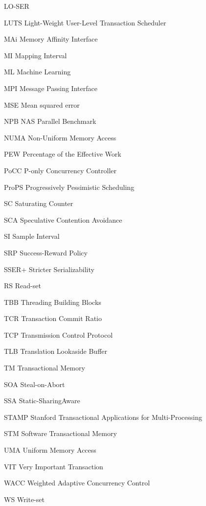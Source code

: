\documentclass[tese,capa,english]{texufpel}
\begin{document}
\begin{listofabbrv}{LO-SER}
	\item[LUTS]			Light-Weight User-Level Transaction Scheduler
	\item[MAi]			Memory Affinity Interface
	\item[MI]			Mapping Interval
	\item[ML]			Machine Learning	
	\item[MPI] 			Message Passing Interface
	\item[MSE]			Mean squared error
	\item[NPB]			NAS Parallel Benchmark
	\item[NUMA]  		Non-Uniform Memory Access
	\item[PEW]			Percentage of the Effective Work
	\item[PoCC]  		P-only Concurrency Controller 
	\item[ProPS] 		Progressively Pessimistic Scheduling
	\item[SC]			Saturating Counter
	\item[SCA]			Speculative Contention Avoidance
	\item[SI]				Sample Interval
	\item[SRP] 			Success-Reward Policy
	\item[SSER+]		Stricter Serializability
	\item[RS]			Read-set
	\item[TBB]			Threading Building Blocks
	\item[TCR]	 		Transaction Commit Ratio
	\item[TCP]			Transmission Control Protocol
	\item[TLB] 			Translation Lookaside Buffer
	\item[TM]    		Transactional Memory	
	\item[SOA]			Steal-on-Abort
	\item[SSA]			Static-SharingAware
	\item[STAMP]		Stanford Transactional Applications for Multi-Processing
	\item[STM]   		Software Transactional Memory
	\item[UMA]		Uniform Memory Access
	\item[VIT]			Very Important Transaction
	\item[WACC] 		Weighted Adaptive Concurrency Control
	\item[WS] 			Write-set
\end{listofabbrv}
\end{document}
